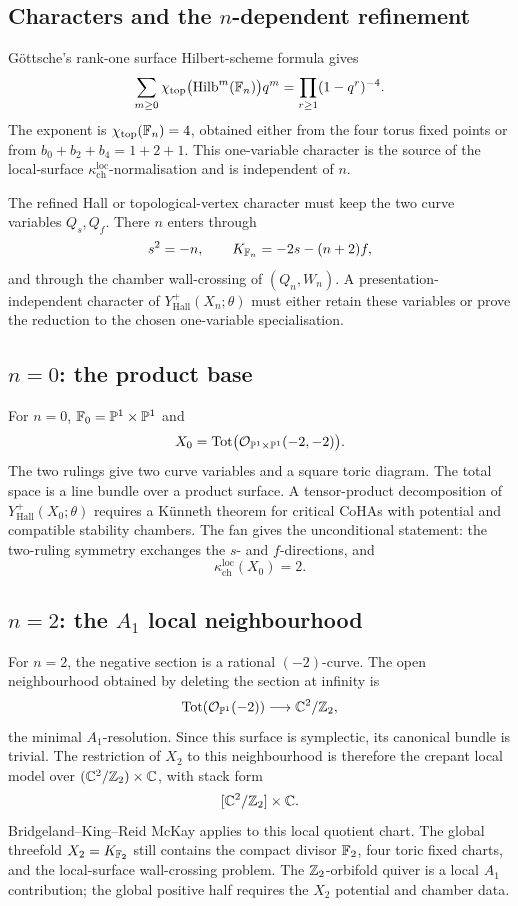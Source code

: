 \subsection*{Characters and the \(n\)-dependent refinement}

G\"ottsche's rank-one surface Hilbert-scheme formula gives
\[
 \sum_{m\geq0}\chi_{\mathrm{top}}\bigl(\mathrm{Hilb}^m(\mathbb{F}_n)\bigr)q^m
 = \prod_{r\geq1}(1-q^r)^{-4}.
\]
The exponent is \(\chi_{\mathrm{top}}(\mathbb{F}_n)=4\), obtained either from
the four torus fixed points or from \(b_0+b_2+b_4=1+2+1\). This
one-variable character is the source of the local-surface
\(\kappa_{\mathrm{ch}}^{\mathrm{loc}}\)-normalisation and is independent
of \(n\).

The refined Hall or topological-vertex character must keep the two
curve variables \(Q_s,Q_f\). There \(n\) enters through
\[
 s^2=-n,\qquad K_{\mathbb{F}_n}=-2s-(n+2)f,
\]
and through the chamber wall-crossing of \((Q_n,W_n)\). A
presentation-independent character of
\(Y^+_{\mathrm{Hall}}(X_n;\theta)\) must either retain these variables
or prove the reduction to the chosen one-variable specialisation.

\subsection*{\(n=0\): the product base}

For \(n=0\), \(\mathbb{F}_0=\mathbb{P}^1\times\mathbb{P}^1\) and
\[
 X_0=\mathrm{Tot}\bigl(\mathcal{O}_{\mathbb{P}^1\times\mathbb{P}^1}(-2,-2)\bigr).
\]
The two rulings give two curve variables and a square toric diagram.
The total space is a line bundle over a product surface. A
tensor-product decomposition of \(Y^+_{\mathrm{Hall}}(X_0;\theta)\)
requires a K\"unneth theorem for critical CoHAs with potential and
compatible stability chambers. The fan gives the unconditional
statement: the two-ruling symmetry exchanges the \(s\)- and
\(f\)-directions, and
\[
 \kappa_{\mathrm{ch}}^{\mathrm{loc}}(X_0)=2.
\]

\subsection*{\(n=2\): the \(A_1\) local neighbourhood}

For \(n=2\), the negative section is a rational \((-2)\)-curve. The
open neighbourhood obtained by deleting the section at infinity is
\[
 \mathrm{Tot}(\mathcal{O}_{\mathbb{P}^1}(-2))\longrightarrow \mathbb{C}^2/\mathbb{Z}_2,
\]
the minimal \(A_1\)-resolution. Since this surface is symplectic, its
canonical bundle is trivial. The restriction of \(X_2\) to this
neighbourhood is therefore the crepant local model over
\((\mathbb{C}^2/\mathbb{Z}_2)\times\mathbb{C}\), with stack form
\[
 [\mathbb{C}^2/\mathbb{Z}_2]\times\mathbb{C} .
\]
Bridgeland--King--Reid McKay applies to this local quotient chart. The
global threefold \(X_2=K_{\mathbb{F}_2}\) still contains the compact divisor
\(\mathbb{F}_2\), four toric fixed charts, and the local-surface wall-crossing
problem. The \(\mathbb{Z}_2\)-orbifold quiver is a local \(A_1\) contribution;
the global positive half requires the \(X_2\) potential and chamber
data.

